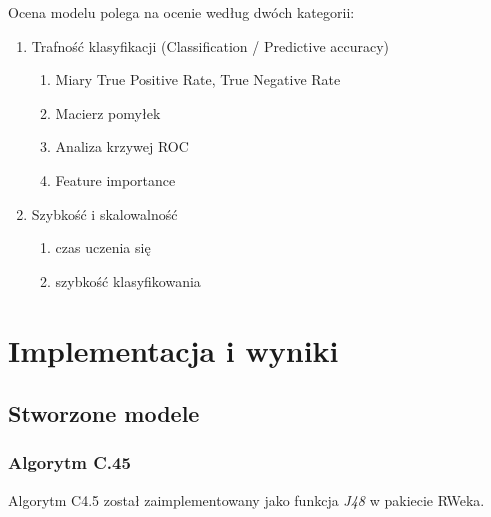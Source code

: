 \documentclass[11pt]{article} %
\begin{document}
Ocena modelu polega na ocenie według dwóch kategorii:
\begin{enumerate}
\item Trafność klasyfikacji (Classification / Predictive accuracy)
	\begin{enumerate}
	\item Miary True Positive Rate, True Negative Rate
	\item Macierz pomyłek
	\item Analiza krzywej ROC
	\item Feature importance
	\end{enumerate}
\item Szybkość i skalowalność
	\begin{enumerate}
	\item czas uczenia się
	\item szybkość klasyfikowania
	\end{enumerate}
\end{enumerate}

\section{Implementacja i wyniki}

\subsection{Stworzone modele}

\subsubsection{Algorytm C.45}

Algorytm C4.5 został zaimplementowany jako funkcja \emph{J48}  w pakiecie RWeka.
\end{document}
